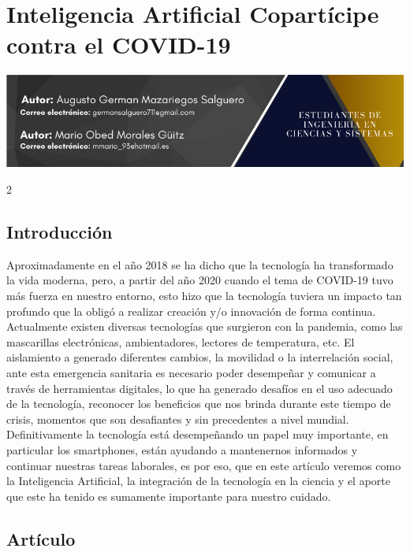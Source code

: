 \documentclass[12pt,spanish,Letterpaper,openany]{book}
\begin{document}
\hypertarget{pareja56}{%
\chapter{Inteligencia Artificial Copartícipe contra el COVID-19}\label{pareja56}}

\begin{center}\includegraphics[width=1\linewidth]{images/pareja56_01} \end{center}

\begin {multicols}{2}

\hypertarget{introducciuxf3n-1}{%
\section{Introducción}\label{introducciuxf3n-1}}

Aproximadamente en el año 2018 se ha dicho que la tecnología ha transformado la
vida moderna, pero, a partir del año 2020 cuando el tema de COVID-19 tuvo más fuerza en
nuestro entorno, esto hizo que la tecnología tuviera un impacto tan profundo que la obligó a
realizar creación y/o innovación de forma continua.
Actualmente existen diversas tecnologías que surgieron con la pandemia, como las
mascarillas electrónicas, ambientadores, lectores de temperatura, etc. El aislamiento a
generado diferentes cambios, la movilidad o la interrelación social, ante esta emergencia
sanitaria es necesario poder desempeñar y comunicar a través de herramientas digitales, lo
que ha generado desafíos en el uso adecuado de la tecnología, reconocer los beneficios que
nos brinda durante este tiempo de crisis, momentos que son desafiantes y sin precedentes a
nivel mundial.
Definitivamente la tecnología está desempeñando un papel muy importante, en particular los
smartphones, están ayudando a mantenernos informados y continuar nuestras tareas
laborales, es por eso, que en este artículo veremos como la Inteligencia Artificial, la
integración de la tecnología en la ciencia y el aporte que este ha tenido es sumamente
importante para nuestro cuidado.

\hypertarget{artuxedculo-3}{%
\section{Artículo}\label{artuxedculo-3}}


\end{multicols}
\end{document}
